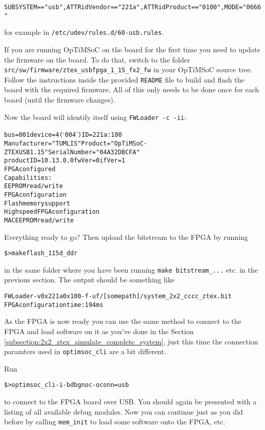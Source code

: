 \begin{alltt}
SUBSYSTEM=="usb", ATTR{idVendor}=="221a", ATTR{idProduct}=="0100", MODE="0666"
\end{alltt}

for example in \verb|/etc/udev/rules.d/60-usb.rules|.

If you are running OpTiMSoC on the board for the first time you need to update
the firmware on the board. To do that, switch to the folder
\verb|src/sw/firmware/ztex_usbfpga_1_15_fx2_fw| in your OpTiMSoC source tree.
Follow the instructions inside the provided \verb|README| file to build and
flash the board with the required firmware. All of this only needs to be done
once for each board (until the firmware changes).

Now the board will identify itself using \verb|FWLoader -c -ii|:

\begin{alltt}
bus=001  device=4 (`004')  ID=221a:100
   Manufacturer="TUM LIS"  Product="OpTiMSoC - ZTEX USB 1.15"    SerialNumber="04A32DBCFA"
   productID=10.13.0.0  fwVer=0  ifVer=1
   FPGA configured
   Capabilities:
      EEPROM read/write
      FPGA configuration
      Flash memory support
      High speed FPGA configuration
      MAC EEPROM read/write
\end{alltt}

Everything ready to go? Then upload the bitstream to the FPGA by running

\begin{alltt}
\$> make flash_115d_ddr
\end{alltt}

in the same folder where you have been running \verb|make bitstream_...| etc.
in the previous section. The output should be something like

\begin{alltt}
FWLoader -v 0x221a 0x100 -f -uf /[somepath]/system_2x2_cccc_ztex.bit
FPGA configuration time: 194 ms
\end{alltt}

As the FPGA is now ready you can use the same method to connect to the
FPGA and load software on it as you've done in the Section
\ref{subsection:2x2_ztex_simulate_complete_system}, just this time the
connection paramters used in \verb|optimsoc_cli| are a bit different.

Run
\begin{alltt}
\$> optimsoc_cli -i -bdbgnoc -oconn=usb
\end{alltt}

to connect to the FPGA board over USB. You should again be presented with a
listing of all available debug modules. Now you can continue just as you did
before by calling \verb|mem_init| to load some software onto the FPGA, etc.

